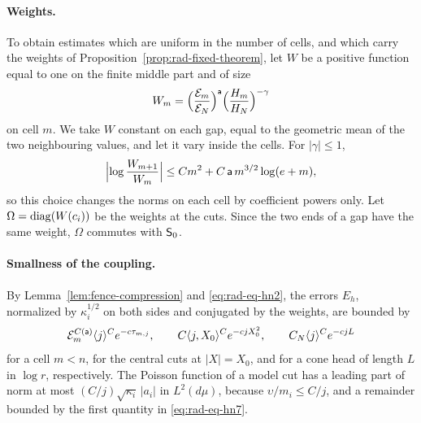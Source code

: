 \paragraph{Weights.}
To obtain estimates which are uniform in the number of cells, and
which carry the weights of
Proposition~\ref{prop:rad-fixed-theorem}, let $W$ be a positive
function equal to one on the finite middle part and of size
\begin{equation}\label{eq:rad-eq-hn4}
 W_m=\Bigl(\frac{\mathcal E_m}{\mathcal E_N}\Bigr)^{\mathsf a}
     \Bigl(\frac{H_m}{H_N}\Bigr)^{-\gamma}
\end{equation}
on cell $m$. We take $W$ constant on each gap, equal to the geometric
mean of the two neighbouring values, and let it vary inside the
cells. For $|\gamma|\le1$,
\begin{equation}\label{eq:adjacent-weight-ratio-new}
 \Bigl|\log\frac{W_{m+1}}{W_m}\Bigr|
 \le Cm^2+C\,\mathsf a\,m^{3/2}\log(e+m),
\end{equation}
so this choice changes the norms on each cell by coefficient powers
only. Let $\Omega=\operatorname{diag}(W(c_i))$ be the weights at the cuts. Since
the two ends of a gap have the same weight, $\Omega$ commutes with
$\mathsf S_0$.

\paragraph{Smallness of the coupling.}
By Lemma~\ref{lem:fence-compression} and \eqref{eq:rad-eq-hn2}, the
errors $E_h$, normalized by $\kappa_i^{1/2}$ on both sides and
conjugated by the weights, are bounded by
\begin{equation}\label{eq:rad-eq-hn7}
 \mathcal E_m^{C(\mathsf a)}\langle j\rangle^C e^{-c\tau_{m,j}},\qquad
 C\langle j,X_0\rangle^Ce^{-cjX_0^2},\qquad
 C_N\langle j\rangle^Ce^{-cjL}
\end{equation}
for a cell $m<n$, for the central cuts at $|X|=X_0$, and for a cone
head of length $L$ in $\log r$, respectively. The Poisson function of
a model cut has a leading part of norm at most
$(C/j)\sqrt{\kappa_i}\,|a_i|$ in $L^2(d\mu)$, because
$\upsilon/m_i\le C/j$, and a remainder bounded by the first quantity
in \eqref{eq:rad-eq-hn7}.

